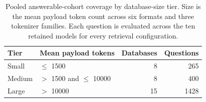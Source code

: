 \begin{table}[htb]
  \centering
  \caption{Pooled answerable-cohort coverage by database-size tier. Size is the mean payload
    token count across six formats and three tokenizer families. Each question is
    evaluated across the ten retained models for every retrieval configuration.}
  \label{tab:pipeline-size-cohorts}
  \small
  \begin{tabular}{@{}llrr@{}}
    \toprule
    Tier & Mean payload tokens & Databases & Questions \\
    \midrule
    Small & $\leq$ \num{1500} & \num{8} & \num{265} \\
    Medium & $>\!$ \num{1500} and $\leq$ \num{10000} & \num{8} & \num{400} \\
    Large & $>\!$ \num{10000} & \num{15} & \num{1428} \\
    \bottomrule
  \end{tabular}
\end{table}

